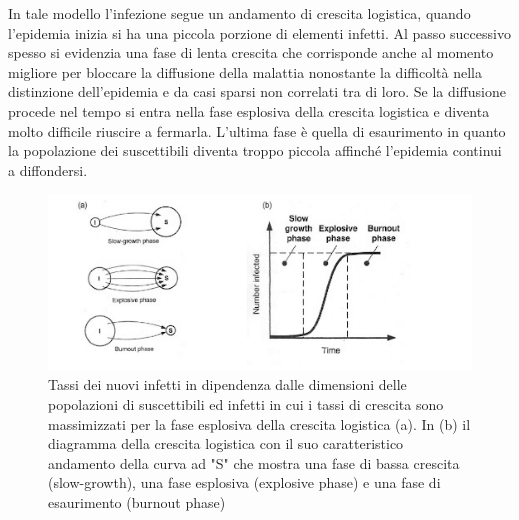 In tale modello l'infezione segue un andamento di crescita logistica, quando l'epidemia inizia si ha una piccola porzione di elementi infetti. Al passo successivo spesso si evidenzia una fase di lenta crescita che corrisponde anche al momento migliore per bloccare la diffusione della malattia nonostante la difficoltà nella distinzione dell'epidemia e da casi sparsi non correlati tra di loro. Se la diffusione procede nel tempo si entra nella fase esplosiva della crescita logistica e diventa molto difficile riuscire a fermarla. L'ultima fase è quella di esaurimento in quanto la popolazione dei suscettibili diventa troppo piccola affinché l'epidemia continui a diffondersi.

\begin{figure}[H]
    \centering
    \includegraphics[width=.85\textwidth]{resources/tasso_sir_2.jpeg}
    \caption{Tassi dei nuovi infetti in dipendenza dalle dimensioni delle popolazioni di suscettibili ed infetti in cui i tassi di crescita sono massimizzati per la fase esplosiva della crescita logistica (a). In (b) il diagramma della crescita logistica con il suo caratteristico andamento della curva ad "S" che mostra una fase di bassa crescita (slow-growth), una fase esplosiva (explosive phase) e una fase di esaurimento (burnout phase)} 
\end{figure}


